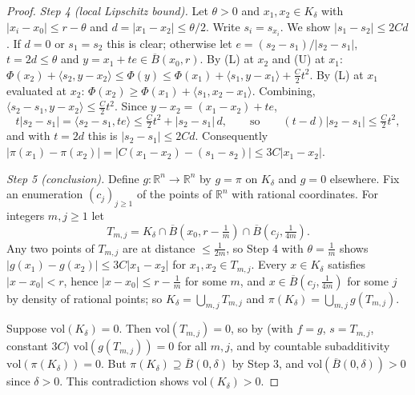 \begin{proof}
\emph{Step 4 (local Lipschitz bound).} Let $\theta>0$ and $x_1,x_2\in K_\delta$ with $|x_i-x_0|\le r-\theta$ and $d=|x_1-x_2|\le\theta/2$. Write $s_i=s_{x_i}$. We show $|s_1-s_2|\le2Cd$. If $d=0$ or $s_1=s_2$ this is clear; otherwise let $e=(s_2-s_1)/|s_2-s_1|$, $t=2d\le\theta$ and $y=x_1+te\in\overline B(x_0,r)$. By (L) at $x_2$ and (U) at $x_1$: $\Phi(x_2)+\langle s_2,y-x_2\rangle\le\Phi(y)\le\Phi(x_1)+\langle s_1,y-x_1\rangle+\frac C2t^2$. By (L) at $x_1$ evaluated at $x_2$: $\Phi(x_2)\ge\Phi(x_1)+\langle s_1,x_2-x_1\rangle$. Combining, $\langle s_2-s_1,y-x_2\rangle\le\frac C2t^2$. Since $y-x_2=(x_1-x_2)+te$,
\[
t|s_2-s_1|=\langle s_2-s_1,te\rangle\le\tfrac C2t^2+|s_2-s_1|\,d,\qquad\text{so}\qquad (t-d)|s_2-s_1|\le\tfrac C2t^2 ,
\]
and with $t=2d$ this is $|s_2-s_1|\le2Cd$. Consequently $|\pi(x_1)-\pi(x_2)|=|C(x_1-x_2)-(s_1-s_2)|\le3C|x_1-x_2|$.

\emph{Step 5 (conclusion).} Define $g:\mathbb R^n\to\mathbb R^n$ by $g=\pi$ on $K_\delta$ and $g=0$ elsewhere. Fix an enumeration $(c_j)_{j\ge1}$ of the points of $\mathbb R^n$ with rational coordinates. For integers $m,j\ge1$ let
\[
T_{m,j}=K_\delta\cap\overline B(x_0,r-\tfrac1m)\cap\overline B(c_j,\tfrac1{4m}) .
\]
Any two points of $T_{m,j}$ are at distance $\le\frac1{2m}$, so Step 4 with $\theta=\frac1m$ shows $|g(x_1)-g(x_2)|\le3C|x_1-x_2|$ for $x_1,x_2\in T_{m,j}$. Every $x\in K_\delta$ satisfies $|x-x_0|<r$, hence $|x-x_0|\le r-\frac1m$ for some $m$, and $x\in\overline B(c_j,\frac1{4m})$ for some $j$ by density of rational points; so $K_\delta=\bigcup_{m,j}T_{m,j}$ and $\pi(K_\delta)=\bigcup_{m,j}g(T_{m,j})$.

Suppose $\mathrm{vol}(K_\delta)=0$. Then $\mathrm{vol}(T_{m,j})=0$, so by  (with $f=g$, $s=T_{m,j}$, constant $3C$) $\mathrm{vol}(g(T_{m,j}))=0$ for all $m,j$, and by countable subadditivity $\mathrm{vol}(\pi(K_\delta))=0$. But $\pi(K_\delta)\supseteq\overline B(0,\delta)$ by Step 3, and $\mathrm{vol}(\overline B(0,\delta))>0$ since $\delta>0$. This contradiction shows $\mathrm{vol}(K_\delta)>0$.
\end{proof}
